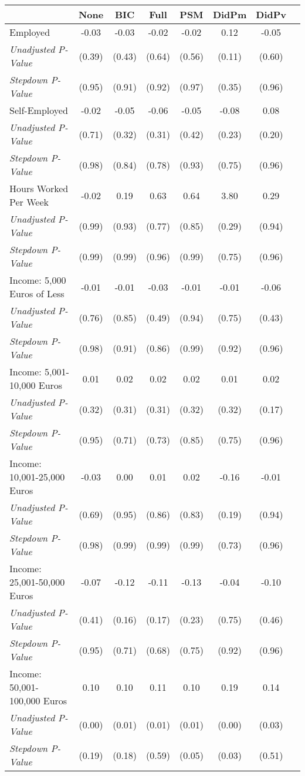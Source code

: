 \begin{tabular}{l c c c c c c c}
\toprule
 & None & BIC & Full & PSM & DidPm & DidPv \\
\midrule
Employed & -0.03 & -0.03 & -0.02 & -0.02 & 0.12 & -0.05 \\
\quad \textit{Unadjusted P-Value} & (0.39) & (0.43) & (0.64) & (0.56) & (0.11) & (0.60) \\
\quad \textit{Stepdown P-Value} & (0.95) & (0.91) & (0.92) & (0.97) & (0.35) & (0.96) \\
Self-Employed & -0.02 & -0.05 & -0.06 & -0.05 & -0.08 & 0.08 \\
\quad \textit{Unadjusted P-Value} & (0.71) & (0.32) & (0.31) & (0.42) & (0.23) & (0.20) \\
\quad \textit{Stepdown P-Value} & (0.98) & (0.84) & (0.78) & (0.93) & (0.75) & (0.96) \\
Hours Worked Per Week & -0.02 & 0.19 & 0.63 & 0.64 & 3.80 & 0.29 \\
\quad \textit{Unadjusted P-Value} & (0.99) & (0.93) & (0.77) & (0.85) & (0.29) & (0.94) \\
\quad \textit{Stepdown P-Value} & (0.99) & (0.99) & (0.96) & (0.99) & (0.75) & (0.96) \\
Income: 5,000 Euros of Less & -0.01 & -0.01 & -0.03 & -0.01 & -0.01 & -0.06 \\
\quad \textit{Unadjusted P-Value} & (0.76) & (0.85) & (0.49) & (0.94) & (0.75) & (0.43) \\
\quad \textit{Stepdown P-Value} & (0.98) & (0.91) & (0.86) & (0.99) & (0.92) & (0.96) \\
Income: 5,001-10,000 Euros & 0.01 & 0.02 & 0.02 & 0.02 & 0.01 & 0.02 \\
\quad \textit{Unadjusted P-Value} & (0.32) & (0.31) & (0.31) & (0.32) & (0.32) & (0.17) \\
\quad \textit{Stepdown P-Value} & (0.95) & (0.71) & (0.73) & (0.85) & (0.75) & (0.96) \\
Income: 10,001-25,000 Euros & -0.03 & 0.00 & 0.01 & 0.02 & -0.16 & -0.01 \\
\quad \textit{Unadjusted P-Value} & (0.69) & (0.95) & (0.86) & (0.83) & (0.19) & (0.94) \\
\quad \textit{Stepdown P-Value} & (0.98) & (0.99) & (0.99) & (0.99) & (0.73) & (0.96) \\
Income: 25,001-50,000 Euros & -0.07 & -0.12 & -0.11 & -0.13 & -0.04 & -0.10 \\
\quad \textit{Unadjusted P-Value} & (0.41) & (0.16) & (0.17) & (0.23) & (0.75) & (0.46) \\
\quad \textit{Stepdown P-Value} & (0.95) & (0.71) & (0.68) & (0.75) & (0.92) & (0.96) \\
Income: 50,001-100,000 Euros & 0.10 & 0.10 & 0.11 & 0.10 & 0.19 & 0.14 \\
\quad \textit{Unadjusted P-Value} & (0.00) & (0.01) & (0.01) & (0.01) & (0.00) & (0.03) \\
\quad \textit{Stepdown P-Value} & (0.19) & (0.18) & (0.59) & (0.05) & (0.03) & (0.51) \\
\bottomrule
\end{tabular}
